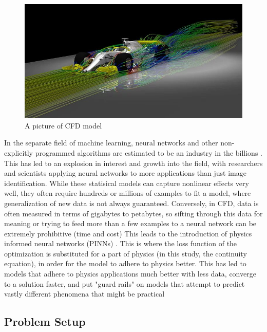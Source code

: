 \documentclass{article}
\begin{document}
     \begin{figure}[h]
		\centering
		\includegraphics[scale=0.4]{./images/cfd.jpg}
		\caption{A picture of CFD model \cite{ANSYS.com}}
		\label{fig:CFD_Image}
	\end{figure}
		
	In the separate field of machine learning, neural networks and other non-explicitly programmed algorithms are estimated to be an industry in the billions \cite{nn_history}. This has led to an explosion in interest and growth into the field, with researchers and scientists applying neural networks to more applications than just image identification. While these statisical models can capture nonlinear effects very well, they often require hundreds or millions of examples to fit a model, where generalization of new data is not always guaranteed. Conversely, in CFD, data is often measured in terms of gigabytes to petabytes, so sifting through this data for meaning or trying to feed more than a few examples to a neural network can be extremely prohibitive (time and cost) \cite{DBLP:journals/corr/abs-1711-10566} This leads to the introduction of physics informed neural networks (PINNs) \cite{PINN_History} . This is where the loss function of the optimization is substituted for a part of physics (in this study, the continuity equation), in order for the model to adhere to physics better. This has led to models that adhere to physics applications much better with less data, converge to a solution faster, and put "guard rails" on models that attempt to predict vastly different phenomena that might be practical \cite{DBLP:journals/corr/abs-1711-10561}
	
	\pagebreak
	
	\subsection{Problem Setup}
	
\end{document}
